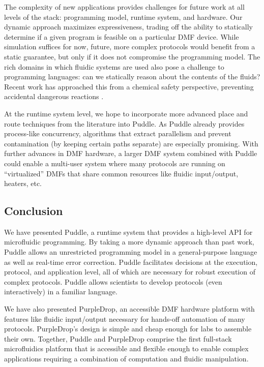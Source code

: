 \documentclass[sigplan, screen]{acmart}
\newcommand\mw[2][]{\todo[color=blue!20, #1]{\sf #2}}
\begin{document}
\mw[inline]{Add some more future work}

The complexity of new applications provides challenges for future work at all levels of the stack: programming model, runtime system, and hardware.
Our dynamic approach maximizes expressiveness, trading off the ability to statically determine if a given program is feasible on a particular DMF device.
While simulation suffices for now, future, more complex protocols would benefit from a static guarantee, but only if it does not compromise the programming model.
The rich domains in which fluidic systems are used also pose a challenge to programming languages: can we statically reason about the contents of the fluids?
Recent work has approached this from a chemical safety perspective, preventing accidental dangerous reactions \cite{ott2018bioscript}.

At the runtime system level, we hope to incorporate more advanced place and route techniques from the literature into Puddle.
As Puddle already provides process-like concurrency, algorithms that extract parallelism and prevent contamination (by keeping certain paths separate) are especially promising.
With further advances in DMF hardware, a larger DMF system combined with Puddle could enable a multi-user system where many protocols are running on ``virtualized'' DMFs that share common resources like fluidic input/output, heaters, etc.

\subsection{Conclusion}

We have presented Puddle, a runtime system that provides a high-level API for microfluidic programming.
By taking a more dynamic approach than past work, Puddle allows an unrestricted programming model in a general-purpose language as well as real-time error correction.
Puddle facilitates decisions at the execution, protocol, and application level, all of which are necessary for robust execution of complex protocols.
Puddle allows scientists to develop protocols (even interactively) in a familiar language.

We have also presented PurpleDrop, an accessible DMF hardware platform with features like fluidic input/output necessary for hands-off automation of many protocols.
PurpleDrop's design is simple and cheap enough for labs to assemble their own.
Together, Puddle and PurpleDrop comprise the first full-stack microfluidics platform that is accessible and flexible enough to enable complex applications requiring a combination of computation and fluidic manipulation.
\end{document}
